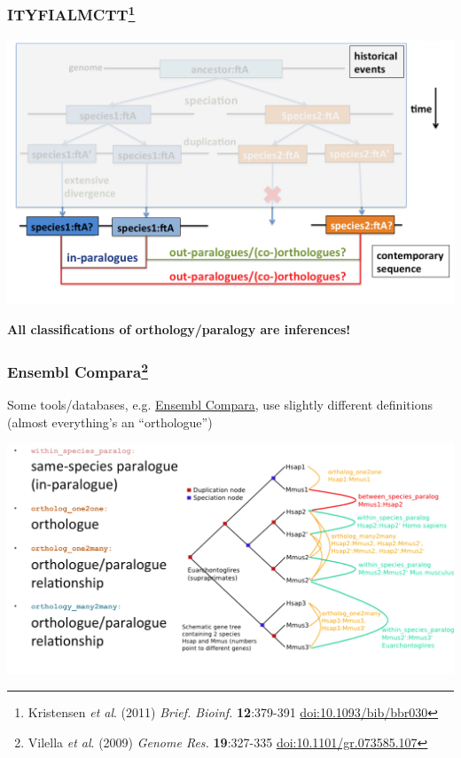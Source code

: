 \begin{frame}
  \frametitle{ITYFIALMCTT\footnote{\tiny{Kristensen \textit{et al}. (2011) \textit{Brief. Bioinf.} \textbf{12}:379-391 \href{http://dx.doi.org/10.1093/bib/bbr030}{doi:10.1093/bib/bbr030}}}}
  \begin{center}
    \includegraphics[width=1\textwidth]{images/logues6}  
  \end{center} 
  \textbf{All classifications of orthology/paralogy are inferences!}
\end{frame}

\begin{frame}
  \frametitle{Ensembl Compara\footnote{\tiny{Vilella \textit{et al}. (2009) \textit{Genome Res.} \textbf{19}:327-335 \href{http://dx.doi.org/10.1101/gr.073585.107}{doi:10.1101/gr.073585.107}}}}
  Some tools/databases, e.g. \href{http://www.ensembl.org/info/genome/compara/index.html}{Ensembl Compara}, use slightly different definitions (almost everything's an ``orthologue'')
  \begin{center}
    \includegraphics[width=1\textwidth]{images/logues7}  
  \end{center} 
\end{frame}